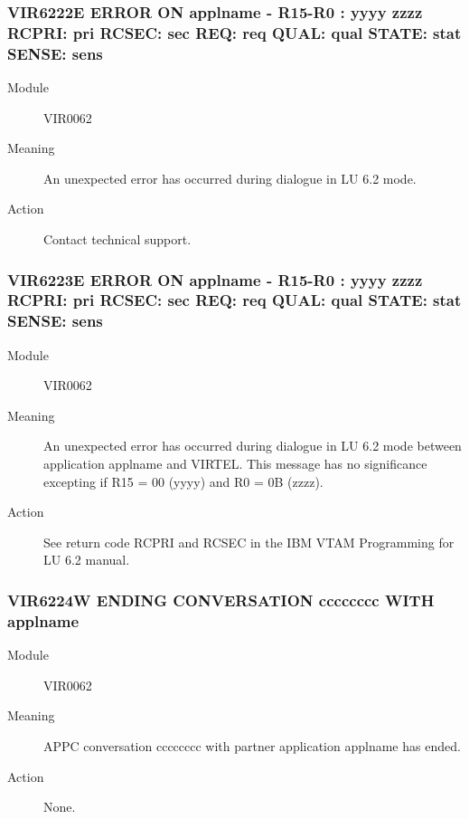 \documentclass[letterpaper,10pt,english]{sphinxmanual}
\begin{document}
\subsubsection{VIR6222E ERROR ON applname - R15-R0 : yyyy zzzz RCPRI: pri RCSEC: sec REQ: req QUAL: qual STATE: stat SENSE: sens}
\label{\detokenize{messages:vir6222e-error-on-applname-r15-r0-yyyy-zzzz-rcpri-pri-rcsec-sec-req-req-qual-qual-state-stat-sense-sens}}\begin{description}
\item[{Module}] \leavevmode
VIR0062

\item[{Meaning}] \leavevmode
An unexpected error has occurred during dialogue in LU 6.2 mode.

\item[{Action}] \leavevmode
Contact technical support.

\end{description}


\subsubsection{VIR6223E ERROR ON applname - R15-R0 : yyyy zzzz RCPRI: pri RCSEC: sec REQ: req QUAL: qual STATE: stat SENSE: sens}
\label{\detokenize{messages:vir6223e-error-on-applname-r15-r0-yyyy-zzzz-rcpri-pri-rcsec-sec-req-req-qual-qual-state-stat-sense-sens}}\begin{description}
\item[{Module}] \leavevmode
VIR0062

\item[{Meaning}] \leavevmode
An unexpected error has occurred during dialogue in LU 6.2 mode between application applname and VIRTEL. This message has no significance excepting if R15 = 00 (yyyy) and R0 = 0B (zzzz).

\item[{Action}] \leavevmode
See return code RCPRI and RCSEC in the IBM VTAM Programming for LU 6.2 manual.

\end{description}


\subsubsection{VIR6224W ENDING CONVERSATION cccccccc WITH applname}
\label{\detokenize{messages:vir6224w-ending-conversation-cccccccc-with-applname}}\begin{description}
\item[{Module}] \leavevmode
VIR0062

\item[{Meaning}] \leavevmode
APPC conversation cccccccc with partner application applname has ended.

\item[{Action}] \leavevmode
None.

\end{description}
\end{document}
